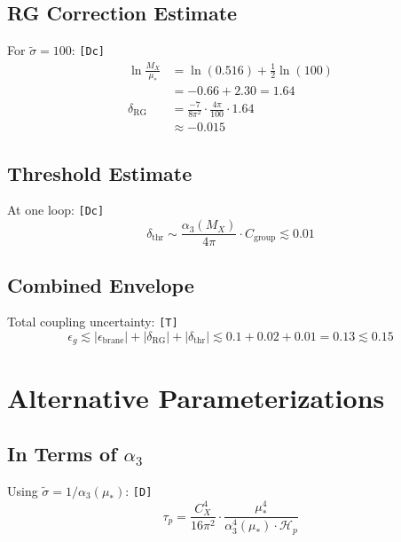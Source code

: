 \documentclass[11pt,a4paper]{article}
\newcommand{\tagD}{\textcolor{green!50!black}{\texttt{[D]}}}
\newcommand{\tagDc}{\textcolor{blue!70!black}{\texttt{[Dc]}}}
\newcommand{\tagT}{\textcolor{cyan!70!black}{\texttt{[T]}}}
\theoremstyle{definition}
\begin{document}
\subsection{RG Correction Estimate}
\label{app:rg-estimate}

For $\tilde{\sigma} = 100$: \tagDc{}
\begin{align}
\label{eq:app-rg-1}
\ln\frac{M_X}{\mu_*} &= \ln(0.516) + \frac{1}{2}\ln(100) \\
\label{eq:app-rg-2}
&= -0.66 + 2.30 = 1.64 \\
\label{eq:app-rg-3}
\delta_{\text{RG}} &= \frac{-7}{8\pi^2} \cdot \frac{4\pi}{100} \cdot 1.64 \\
\label{eq:app-rg-4}
&\approx -0.015
\end{align}

\subsection{Threshold Estimate}
\label{app:thr-estimate}

At one loop: \tagDc{}
\begin{equation}
\label{eq:app-thr-1}
\delta_{\text{thr}} \sim \frac{\alpha_3(M_X)}{4\pi} \cdot C_{\text{group}} \lesssim 0.01
\end{equation}

\subsection{Combined Envelope}
\label{app:envelope}

Total coupling uncertainty: \tagT{}
\begin{equation}
\label{eq:app-env-1}
\epsilon_g \lesssim |\epsilon_{\text{brane}}| + |\delta_{\text{RG}}| + |\delta_{\text{thr}}| \lesssim 0.1 + 0.02 + 0.01 = 0.13 \lesssim 0.15
\end{equation}

\section{Alternative Parameterizations}
\label{app:alt-param}

\subsection{In Terms of $\alpha_3$}
\label{app:alpha3-param}

Using $\tilde{\sigma} = 1/\alpha_3(\mu_*)$: \tagD{}
\begin{equation}
\label{eq:app-alpha3-tau}
\tau_p = \frac{C_X^4}{16\pi^2} \cdot \frac{\mu_*^4}{\alpha_3^4(\mu_*) \cdot \mathcal{H}_p}
\end{equation}
\end{document}
